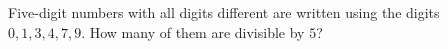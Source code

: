 Five-digit numbers with all digits different are written using the digits $0,1,3,4,7,9$. How many of them are divisible by $5$?
